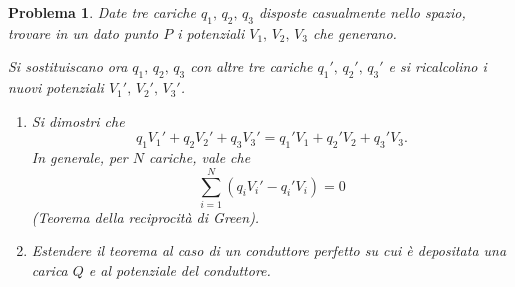 \documentclass[b5paper,twoside]{book}
\newtheorem{problema}{Problema}
\begin{document}
\begin{problema}
	Date tre cariche $q_1,\,q_2,\,q_3$ disposte casualmente nello spazio, trovare
	in un dato punto $P$ i potenziali $V_1,\,V_2,\,V_3$ che generano.
	
	Si sostituiscano ora $q_1,\,q_2,\,q_3$ con altre tre cariche
	$q_1',\,q_2',\,q_3'$ e si ricalcolino i nuovi potenziali $V_1',\,V_2',\,V_3'$.
	\begin{enumerate}
		\item Si dimostri che
		$$
		q_1V_1' + q_2V_2' + q_3V_3' =
		q_1'V_1 + q_2'V_2 + q_3'V_3.
		$$
		In generale, per $N$ cariche, vale che
		$$
		\sum_{i=1}^{N} (q_iV_i' - q_i'V_i) = 0
		$$
		(Teorema della reciprocità di Green).
		\item Estendere il teorema al caso di un conduttore perfetto su cui è
		depositata una carica $Q$ e al potenziale del conduttore.
	\end{enumerate}
\end{problema}
\end{document}
